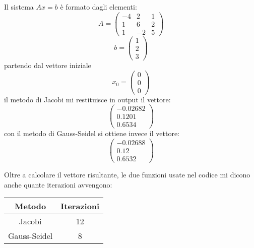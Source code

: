 

\begin{flushleft}
Il sistema $Ax=b$ è formato dagli elementi:
\[
A = \left(\begin{array}{ccc} -4 & 2 & 1\\ 1 & 6 & 2\\ 1 & -2 & 5 \end{array}\right)
\]
\[
b= \left(\begin{array}{c} 1\\ 2\\ 3 \end{array}\right)
\]
partendo dal vettore iniziale 
\[
x_0 = \left(\begin{array}{c} 0\\ 0\\ 0 \end{array}\right)
\]
il metodo di Jacobi mi restituisce in output il vettore:
\[
\left(\begin{array}{c} -0.02682\\ 0.1201\\ 0.6534 \end{array}\right)
\] 
con il metodo di Gauss-Seidel si ottiene invece il vettore:
\[
\left(\begin{array}{c} -0.02688\\ 0.12\\ 0.6532 \end{array}\right)
\]

Oltre a calcolare il vettore risultante, le due funzioni usate nel codice mi dicono anche quante iterazioni avvengono:
\begin{center}
\begin{tabular}{c|c}
\hline
Metodo & Iterazioni\\
\hline
Jacobi & 12 \\
Gauss-Seidel & 8\\
\hline
\end{tabular}
\end{center}
\end{flushleft}